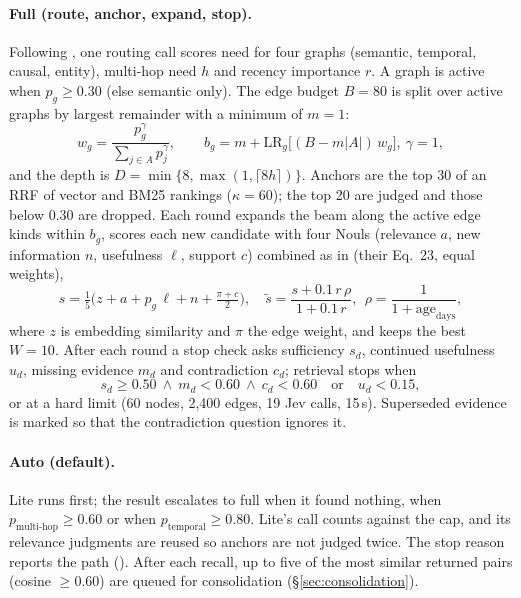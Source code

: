 \paragraph{Full (route, anchor, expand, stop).} Following \jevmempaper{}, one routing call scores need for four graphs (semantic, temporal, causal, entity), multi-hop need $h$ and recency importance $r$. A graph is active when $p_g\ge 0.30$ (else semantic only). The edge budget $B=80$ is split over active graphs by largest remainder with a minimum of $m=1$:
\begin{equation}
w_g=\frac{p_g^{\gamma}}{\sum_{j\in A}p_j^{\gamma}},\qquad b_g=m+\mathrm{LR}_g\big[(B-m|A|)\,w_g\big],\ \gamma=1,
\end{equation}
and the depth is $D=\min\{8,\max(1,\lceil 8h\rceil)\}$. Anchors are the top 30 of an RRF of vector and BM25 rankings ($\kappa=60$); the top 20 are judged and those below 0.30 are dropped. Each round expands the beam along the active edge kinds within $b_g$, scores each new candidate with four Nouls (relevance $a$, new information $n$, usefulness $\ell$, support $c$) combined as in \jevmempaper{} (their Eq.~23, equal weights),
\begin{equation}
s=\tfrac15\Big(z+a+p_g\,\ell+n+\tfrac{\pi+c}{2}\Big),\quad
\tilde s=\frac{s+0.1\,r\,\rho}{1+0.1\,r},\ \ \rho=\frac{1}{1+\text{age}_\text{days}},
\end{equation}
where $z$ is embedding similarity and $\pi$ the edge weight, and keeps the best $W=10$. After each round a stop check asks sufficiency $s_d$, continued usefulness $u_d$, missing evidence $m_d$ and contradiction $c_d$; retrieval stops when
\begin{equation}
s_d\ge 0.50\ \wedge\ m_d<0.60\ \wedge\ c_d<0.60\quad\text{or}\quad u_d<0.15,
\end{equation}
or at a hard limit (60 nodes, 2{,}400 edges, 19 Jev calls, 15\,s). Superseded evidence is marked so that the contradiction question ignores it.

\paragraph{Auto (default).} Lite runs first; the result escalates to full when it found nothing, when $p_\text{multi-hop}\ge 0.60$ or when $p_\text{temporal}\ge 0.80$. Lite's call counts against the cap, and its relevance judgments are reused so anchors are not judged twice. The stop reason reports the path (). After each recall, up to five of the most similar returned pairs (cosine $\ge 0.60$) are queued for consolidation (\S\ref{sec:consolidation}).


